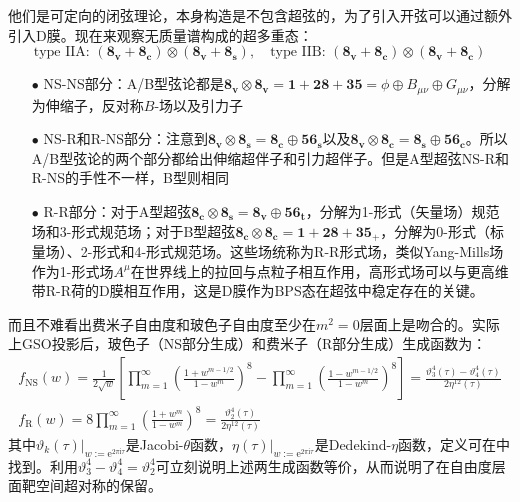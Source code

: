 他们是可定向的闭弦理论，本身构造是不包含超弦的，为了引入开弦可以通过额外引入D膜。现在来观察无质量谱构成的超多重态：
\begin{equation}
	\text{type IIA: }(\mathbf{8_v}+\mathbf{8_c})\otimes(\mathbf{8_v}+\mathbf{8_s}),\quad \text{type IIB: }(\mathbf{8_v}+\mathbf{8_c})\otimes(\mathbf{8_v}+\mathbf{8_c})
\end{equation}
\begin{itemize}
	\item[$\bullet$]NS-NS部分：A/B型弦论都是$\mathbf{8_v}\otimes\mathbf{8_v}=\mathbf{1}+\mathbf{28}+\mathbf{35}=\phi\oplus B_{\mu\nu}\oplus G_{\mu\nu}$，分解为伸缩子，反对称$B$-场以及引力子
	\item[$\bullet$]NS-R和R-NS部分：注意到$\mathbf{8_v}\otimes\mathbf{8_s}=\mathbf{8_c}\oplus\mathbf{56_s}$以及$\mathbf{8_v}\otimes\mathbf{8_c}=\mathbf{8_s}\oplus\mathbf{56_c}$。所以A/B型弦论的两个部分都给出伸缩超伴子和引力超伴子。但是A型超弦NS-R和R-NS的手性不一样，B型则相同
	\item[$\bullet$]R-R部分：对于A型超弦$\mathbf{8_c}\otimes\mathbf{8_s}=\mathbf{8_v}\oplus\mathbf{56_t}$，分解为1-形式（矢量场）规范场和3-形式规范场；对于B型超弦$\mathbf{8_c}\otimes\mathbf{8_c}=\mathbf{1}+\mathbf{2}\mathbf{8}+\mathbf{3}\mathbf{5_+}$，分解为0-形式（标量场）、2-形式和4-形式规范场。这些场统称为R-R形式场，类似Yang-Mills场作为1-形式场$A^\mu$在世界线上的拉回与点粒子相互作用，高形式场可以与更高维带R-R荷的D膜相互作用，这是D膜作为BPS态在超弦中稳定存在的关键。
\end{itemize}
而且不难看出费米子自由度和玻色子自由度至少在$m^2=0$层面上是吻合的。实际上GSO投影后，玻色子（NS部分生成）和费米子（R部分生成）生成函数为：
\begin{equation}
	\begin{gathered}
		f_{\mathrm{NS}}(w)=\frac{1}{2\sqrt{w}}\left[\prod_{m=1}^{\infty}\left(\frac{1+w^{m-1/2}}{1-w^m}\right)^8-\prod_{m=1}^{\infty}\left(\frac{1-w^{m-1/2}}{1-w^m}\right)^8\right]=\frac{\vartheta_3^4(\tau)-\vartheta_4^4(\tau)}{2\eta^{12}(\tau)}\\
	f_{\mathrm{R}}(w)=8\prod_{m=1}^\infty\left(\frac{1+w^m}{1-w^m}\right)^8=\frac{\vartheta_2^4(\tau)}{2\eta^{12}(\tau)}
	\end{gathered}
\end{equation}
其中$\vartheta_k(\tau)|_{w:=\mathrm{e}^{2\pi\mathrm{i}\tau}}$是Jacobi-$\theta$函数，$\eta(\tau)|_{w:=\mathrm{e}^{2\pi\mathrm{i}\tau}}$是Dedekind-$\eta$函数，定义可在\cite{Blumenhagen:2013fgp}中找到。利用$\vartheta^4_3-\vartheta^4_4=\vartheta^4_2$\cite{wzx,Hirschhorn2017}可立刻说明上述两生成函数等价，从而说明了在自由度层面靶空间超对称的保留。

